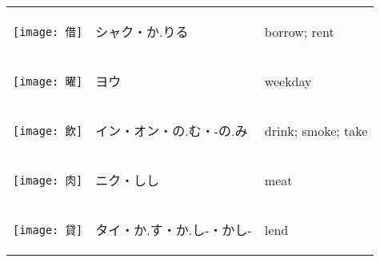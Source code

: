 \documentclass[a4paper,12pt]{extarticle}
\begin{document}
\begin{longtable}{|lp{6cm}p{4cm}|}
\begin{minipage}{0.3\textwidth}
\centerline{
	\texttt{[image: 借]}
}
\end{minipage}
&
\begin{CJK}{UTF8}{min}シャク・か.りる\end{CJK}
&
borrow; rent
\\ 
\begin{minipage}{0.3\textwidth}
\centerline{
	\texttt{[image: 曜]}
}
\end{minipage}
&
\begin{CJK}{UTF8}{min}ヨウ\end{CJK}
&
weekday
\\ 
\begin{minipage}{0.3\textwidth}
\centerline{
	\texttt{[image: 飲]}
}
\end{minipage}
&
\begin{CJK}{UTF8}{min}イン・オン・の.む・-の.み\end{CJK}
&
drink; smoke; take
\\ 
\begin{minipage}{0.3\textwidth}
\centerline{
	\texttt{[image: 肉]}
}
\end{minipage}
&
\begin{CJK}{UTF8}{min}ニク・しし\end{CJK}
&
meat
\\ 
\begin{minipage}{0.3\textwidth}
\centerline{
	\texttt{[image: 貸]}
}
\end{minipage}
&
\begin{CJK}{UTF8}{min}タイ・か.す・か.し-・かし-\end{CJK}
&
lend
\\ 

\end{longtable}
\end{document}
